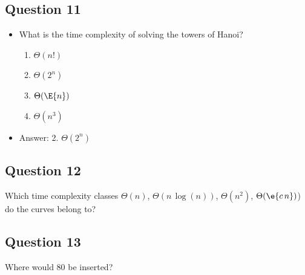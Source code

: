\begin{slide}
\section[-1]{Question 11}

\begin{PauseHighLight}
  \begin{itemize}
  \item What is the time complexity of solving the towers of Hanoi?
    \begin{enumerate}
    \item $\Theta(n!)$
    \item $\Theta(2^n)$
    \item $\Theta(\E{n})$
    \item $\Theta(n^3)$\pause
    \end{enumerate}
  \item Answer: 2. $\Theta(2^n)$\pauseb
  \end{itemize}
\end{PauseHighLight}
\end{slide}

\begin{slide}
\section[-1]{Question 12}

\pb
  Which time complexity classes $\Theta(n)$, $\Theta(n\,\log(n))$, $\Theta(n^2)$, $\Theta(\e{c\,n})$) do the curves belong to?\pauseh
\pauseh{}  \begin{center}
  \pause
  \end{center}
\end{slide}

\begin{slide}
\section[-1]{Question 13}

\pb
  Where would 80 be inserted?\pauseh
\pauseh{}  \begin{center}
  \pause
  \end{center}
\end{slide}

